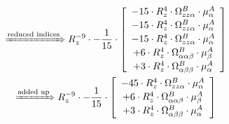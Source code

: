 \documentclass{article}
\begin{document}
\begin{subequations}
\begin{gather}
\\ \xRightarrow{\text{reduced indices}}
 R_{z}^{-9} \cdot - \frac{1}{15} \cdot  \left[ \begin{array}{c} 
 		- 15 \cdot R_{z}^{4} \cdot \Omega{}^{B}_{zz\alpha{}} \cdot \mu{}^{A}_{\alpha{}} 
 \\[0.2em] 		 - 15 \cdot R_{z}^{4} \cdot \Omega{}^{B}_{zz\alpha{}} \cdot \mu{}^{A}_{\alpha{}} 
 \\[0.2em] 		 - 15 \cdot R_{z}^{4} \cdot \Omega{}^{B}_{zz\alpha{}} \cdot \mu{}^{A}_{\alpha{}} 
 \\[0.2em] 		 + 6 \cdot R_{z}^{4} \cdot \Omega{}^{B}_{\alpha{}\alpha{}\beta{}} \cdot \mu{}^{A}_{\beta{}} 
 \\[0.2em] 		 + 3 \cdot R_{z}^{4} \cdot \Omega{}^{B}_{\alpha{}\beta{}\beta{}} \cdot \mu{}^{A}_{\alpha{}}
 \end{array}\right] 
\\ \xRightarrow{\text{added up}}
 R_{z}^{-9} \cdot - \frac{1}{15} \cdot  \left[ \begin{array}{c} 
 		- 45 \cdot R_{z}^{4} \cdot \Omega{}^{B}_{zz\alpha{}} \cdot \mu{}^{A}_{\alpha{}} 
 \\[0.2em] 		 + 6 \cdot R_{z}^{4} \cdot \Omega{}^{B}_{\alpha{}\alpha{}\beta{}} \cdot \mu{}^{A}_{\beta{}} 
 \\[0.2em] 		 + 3 \cdot R_{z}^{4} \cdot \Omega{}^{B}_{\alpha{}\beta{}\beta{}} \cdot \mu{}^{A}_{\alpha{}}
 \end{array}\right] 
\end{gather}\end{subequations}
\end{document}
